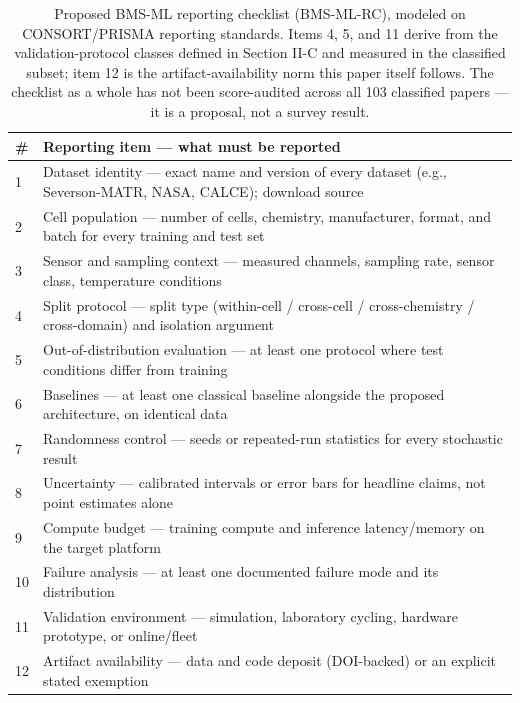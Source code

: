 \documentclass[journal]{IEEEtran}
\begin{document}
\begin{table}[!t]
\caption{Proposed BMS-ML reporting checklist (BMS-ML-RC), modeled on CONSORT/PRISMA reporting standards. Items 4, 5, and 11 derive from the validation-protocol classes defined in Section II-C and measured in the classified subset; item 12 is the artifact-availability norm this paper itself follows. The checklist as a whole has not been score-audited across all 103 classified papers --- it is a proposal, not a survey result.}
\label{tab:TABLE_CHECKLIST}
\centering
\footnotesize
\begin{tabular}{|p{0.35in}|p{2.81in}|}
\hline
\textbf{\#} & \textbf{Reporting item --- what must be reported} \\
\hline
1 & Dataset identity --- exact name and version of every dataset (e.g., Severson-MATR, NASA, CALCE); download source \\
2 & Cell population --- number of cells, chemistry, manufacturer, format, and batch for every training and test set \\
3 & Sensor and sampling context --- measured channels, sampling rate, sensor class, temperature conditions \\
4 & Split protocol --- split type (within-cell / cross-cell / cross-chemistry / cross-domain) and isolation argument \\
5 & Out-of-distribution evaluation --- at least one protocol where test conditions differ from training \\
6 & Baselines --- at least one classical baseline alongside the proposed architecture, on identical data \\
7 & Randomness control --- seeds or repeated-run statistics for every stochastic result \\
8 & Uncertainty --- calibrated intervals or error bars for headline claims, not point estimates alone \\
9 & Compute budget --- training compute and inference latency/memory on the target platform \\
10 & Failure analysis --- at least one documented failure mode and its distribution \\
11 & Validation environment --- simulation, laboratory cycling, hardware prototype, or online/fleet \\
12 & Artifact availability --- data and code deposit (DOI-backed) or an explicit stated exemption \\
\hline
\end{tabular}
\end{table}
\end{document}
